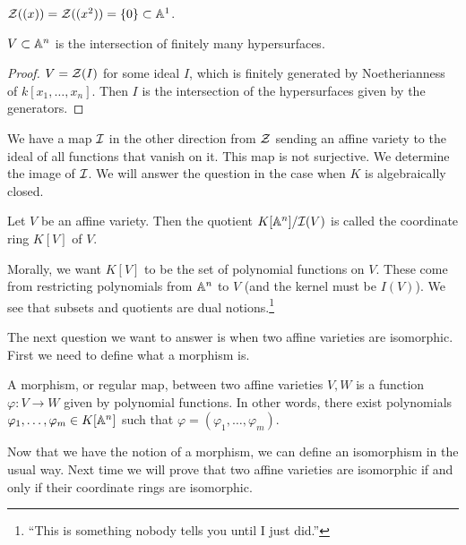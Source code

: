 \message{ !name(notes.tex)}\documentclass[10pt, twoside]{article}
\begin{document}
        \begin{exm}
            $\mathcal{Z}((x)) = \mathcal{Z}((x^2)) = \{0\} \subset \mathbb{A}^1$.
        \end{exm}

        \begin{prop}
            $V \subset \mathbb{A}^n$ is the intersection of finitely many hypersurfaces.
            \begin{proof}
                $V = \mathcal{Z}(I)$ for some ideal $I$, which is finitely generated by Noetherianness of $k[x_1, \ldots, x_n]$. Then $I$ is the intersection of the hypersurfaces given by the generators.
            \end{proof}
        \end{prop}

        We have a map $\mathcal{I}$ in the other direction from $\mathcal{Z}$ sending an affine variety to the ideal of all functions that vanish on it. This map is not surjective. We determine the image of $\mathcal{I}$. We will answer the question in the case when $K$ is algebraically closed.

        \begin{defn}
            Let $V$ be an affine variety. Then the quotient $K[\mathbb{A}^n]/\mathcal{I}(V)$ is called the coordinate ring $K[V]$ of $V$.
        \end{defn}

        Morally, we want $K[V]$ to be the set of polynomial functions on $V$. These come from restricting polynomials from $\mathbb{A}^n$ to $V$ (and the kernel must be $I(V)$). We see that subsets and quotients are dual notions.\footnote{``This is something nobody tells you until I just did.''}

        The next question we want to answer is when two affine varieties are isomorphic. First we need to define what a morphism is.

        \begin{defn}
            A morphism, or regular map, between two affine varieties $V,W$ is a function $\varphi:V \to W$ given by polynomial functions. In other words, there exist polynomials $\varphi_1, \ldots, \varphi_m \in K[\mathbb{A}^n]$ such that $\varphi = (\varphi_1, \ldots, \varphi_m)$.
        \end{defn}

        Now that we have the notion of a morphism, we can define an isomorphism in the usual way. Next time we will prove that two affine varieties are isomorphic if and only if their coordinate rings are isomorphic.
        
\end{document}
